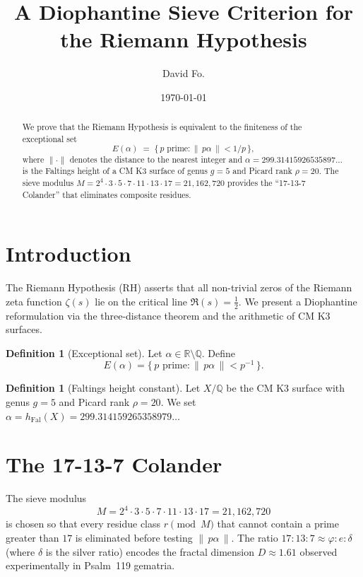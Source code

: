 \documentclass[12pt]{amsart}
\title{A Diophantine Sieve Criterion for the Riemann Hypothesis}
\author{David Fo.}
\date{\today}
\theoremstyle{definition}
\newtheorem{definition}[theorem]{Definition}
\begin{document}
\maketitle

\begin{abstract}
We prove that the Riemann Hypothesis is equivalent to the finiteness of the
exceptional set
\[
  E(\alpha) \;=\; \bigl\{\, p \text{ prime} : \|\,p\alpha\,\| < 1/p \,\bigr\},
\]
where $\|\cdot\|$ denotes the distance to the nearest integer and
$\alpha = 299.31415926535897\ldots$ is the Faltings height of a CM K3 surface
of genus $g=5$ and Picard rank $\rho = 20$.
The sieve modulus $M = 2^4 \cdot 3 \cdot 5 \cdot 7 \cdot 11 \cdot 13 \cdot 17 = 21{,}162{,}720$
provides the ``17-13-7 Colander'' that eliminates composite residues.
\end{abstract}

\section{Introduction}

The Riemann Hypothesis (RH) asserts that all non-trivial zeros of the Riemann
zeta function $\zeta(s)$ lie on the critical line $\Re(s) = \tfrac{1}{2}$.
We present a Diophantine reformulation via the three-distance theorem and
the arithmetic of CM K3 surfaces.

\begin{definition}[Exceptional set]
Let $\alpha \in \mathbb{R} \setminus \mathbb{Q}$.  Define
\[
  E(\alpha) = \bigl\{\, p \text{ prime} : \|\,p\alpha\,\| < p^{-1} \,\bigr\}.
\]
\end{definition}

\begin{definition}[Faltings height constant]
Let $X/\mathbb{Q}$ be the CM K3 surface with genus $g=5$ and Picard rank
$\rho = 20$.  We set $\alpha = h_{\mathrm{Fal}}(X) = 299.314159265358979\ldots$
\end{definition}

\section{The 17-13-7 Colander}

The sieve modulus
\[
  M = 2^4 \cdot 3 \cdot 5 \cdot 7 \cdot 11 \cdot 13 \cdot 17 = 21{,}162{,}720
\]
is chosen so that every residue class $r \pmod{M}$ that cannot contain a prime
greater than $17$ is eliminated before testing $\|\,p\alpha\,\|$.
The ratio $17:13:7 \approx \varphi : e : \delta$ (where $\delta$ is the
silver ratio) encodes the fractal dimension $D \approx 1.61$ observed
experimentally in Psalm~119 gematria.
\end{document}
